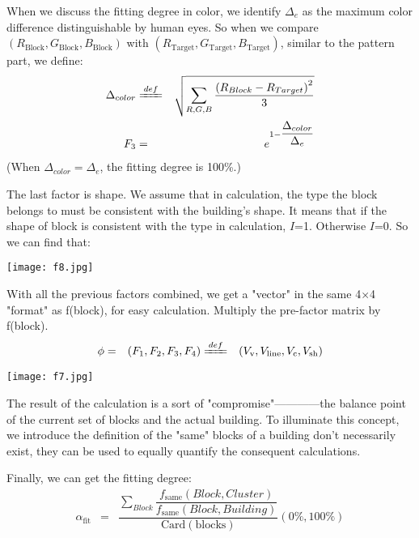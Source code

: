 \documentclass[12pt]{article}
\theoremstyle{definition}
\theoremstyle{remark}
\numberwithin{equation}{section}
\begin{document}
		When we discuss the fitting degree in color, we identify $\Delta_{e}$ as the maximum color difference distinguishable by human eyes. So when we compare $\left(R_\mathrm{Block},G_\mathrm{Block},B_\mathrm{Block}\right)$ with $\left(R_\mathrm{Target},G_\mathrm{Target},B_\mathrm{Target}\right)$, similar to the pattern part, we define:
		\begin{align}
			\Delta_{color}&\xlongequal{def}&\sqrt{\sum_{R,G,B}\dfrac{\left(R_{Block}-R_{Target}\right)^2}{3}}\\
			F_3&=&e^{1-\dfrac{\Delta_{color}}{\Delta_{e}}}
		\end{align}
		(When $\Delta_{color}=\Delta_{e}$, the fitting degree is 100\%.)
		
		The last factor is shape. We assume that in calculation, the type the block belongs to must be consistent with the building's shape. It means that if the shape of block is consistent with the type in calculation, $I$=1. Otherwise $I$=0. So we can find that:
		\begin{center}
			\texttt{[image: f8.jpg]}
		\end{center}
		With all the previous factors combined, we get a "vector" in the same 4$\times$4 "format" as f(block), for easy calculation. Multiply the pre-factor matrix by f(block).
		\begin{align}
			\phi&=&\left(F_1,F_2,F_3,F_4\right)&\xlongequal{def}&\left(V_\mathrm{v},V_\mathrm{line},V_\mathrm{c},V_\mathrm{sh}\right)
		\end{align}
		\begin{center}
		\texttt{[image: f7.jpg]}
		\end{center}
		The result of the calculation is a sort of "compromise"————the balance point of the current set of blocks and the actual building. To illuminate this concept, we introduce the definition of the "same" blocks of a building don't necessarily exist, they can be used to equally quantify the consequent calculations.
	
		Finally, we can get the fitting degree:
		\begin{align}
			\alpha_\mathrm{fit}&=&\dfrac{\sum_{Block}\dfrac{f_\mathrm{same}(Block,Cluster)}{f_\mathrm{same}(Block,Building)}}{\mathrm{Card(blocks)}}(0\%,100\%)
		\end{align}
\end{document}
